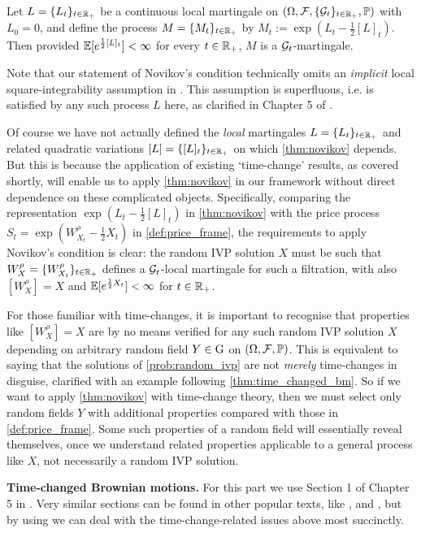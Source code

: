 \begin{theorem}\label{thm:novikov}
    Let $L=\{L_t\}_{t\in\mathbb{R}_+}$ be a continuous local martingale on $(\Omega, \mathcal{F},\{\mathcal{G}_t\}_{t\in\mathbb{R}_+},\mathbb{P})$ with $L_0=0$, and define the process $M = \{M_t\}_{t\in\mathbb{R}_+}$ by $M_t := \exp(L_t - \frac12[L]_t)$. Then provided $\mathbb{E}[e^{\frac12[L]_t}]<\infty$ for every $t\in\mathbb{R}_+$, $M$ is a $\mathcal{G}_t$-martingale.
\end{theorem}

Note that our statement of Novikov's condition technically omits an \emph{implicit} local square-integrability assumption in \cite{ikeda_1989}. This assumption is superfluous, i.e. is satisfied by any such process $L$ here, as clarified in Chapter 5 of \cite{rogers_2000}.

Of course we have not actually defined the \emph{local} martingales $L=\{L_t\}_{t\in\mathbb{R}_+}$ and related quadratic variations $[L]=\{[L]_t\}_{t\in\mathbb{R}_+}$ on which \autoref{thm:novikov} depends. But this is because the application of existing `time-change' results, as covered shortly, will enable us to apply \autoref{thm:novikov} in our framework without direct dependence on these complicated objects. Specifically, comparing the representation $\exp(L_t - \frac12[L]_t)$ in \autoref{thm:novikov} with the price process $S_t=\exp(W^\rho_{X_t}-\frac12 X_t)$ in \autoref{def:price_frame}, the requirements to apply Novikov's condition is clear: the random IVP solution $X$ must be such that $W^\rho_X=\{W^\rho_{X_t}\}_{t\in\mathbb{R}_+}$ defines a $\mathcal{G}_t$-local martingale for such a filtration, with also $[W^\rho_X]=X$ and $\mathbb{E}[e^{\frac12 X_t}]<\infty$ for $t\in\mathbb{R}_+$.

For those familiar with time-changes, it is important to recognise that properties like $[W^\rho_X]=X$ are by no means verified for any such random IVP solution $X$ depending on arbitrary random field $Y\in\mathrm{G}$ on $(\Omega,\mathcal{F},\mathbb{P})$. This is equivalent to saying that the solutions of \autoref{prob:random_ivp} are not \emph{merely} time-changes in disguise, clarified with an example following \autoref{thm:time_changed_bm}. So if we want to apply \autoref{thm:novikov} with time-change theory, then we must select only random fields $Y$ with additional properties compared with those in \autoref{def:price_frame}. Some such properties of a random field will essentially reveal themselves, once we understand related properties applicable to a general process like $X$, not necessarily a random IVP solution.

\vspace{3mm}\textbf{Time-changed Brownian motions.} For this part we use Section 1 of Chapter 5 in \cite{revuz_1999}. Very similar sections can be found in other popular texts, like \cite{ikeda_1989}, \cite{karatzas_1998} and \cite{rogers_2000}, but by using \cite{revuz_1999} we can deal with the time-change-related issues above most succinctly.

